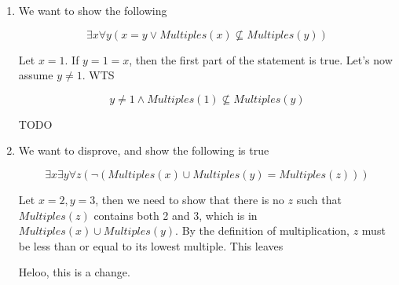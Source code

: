 \documentclass{article}
\newcommand{\mult}{\textit{Multiples}}
\begin{document}
\begin{enumerate}
\begin{enumerate}
		      \item We want to show the following

		            $$
			            \exists x \forall y (x = y \lor \textit{Multiples}(x)
			            \not\subseteq \textit{Multiples}(y))
		            $$

		            Let $x = 1$. If $y = 1 = x$, then the first part of the statement is true. Let's
		            now assume $y \ne 1$. WTS

		            $$
			            y \ne 1 \land
			            \textit{Multiples}(1)
			            \not\subseteq \textit{Multiples}(y)
		            $$

		            TODO

		      \item We want to disprove, and show the following is true

		            $$
			            \exists x \exists y \forall z (\lnot (\mult(x) \cup \mult(y) = \mult(z)))
		            $$

					Let $x=2, y=3$, then we need to show that there is no $z$ such that $\mult(z)$
					contains both 2 and 3, which is in $\mult(x) \cup \mult(y)$. By the definition
					of multiplication, $z$ must be less than or equal to its lowest multiple. This leaves

					Heloo, this is a change.
	      \end{enumerate}
\end{enumerate}
\end{document}
